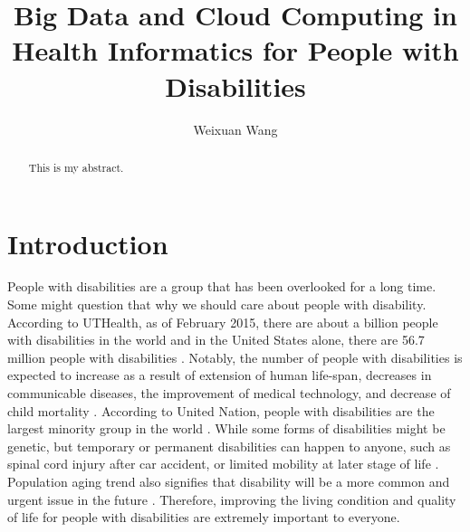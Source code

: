 \documentclass[sigconf]{acmart}
\begin{document}
\title{Big Data and Cloud Computing in Health Informatics for People with Disabilities}


\author{Weixuan Wang}


\renewcommand{\shortauthors}{W. Wang}


\begin{abstract}
This is my abstract.
\end{abstract}



\maketitle



\section{Introduction}
People with disabilities are a group that has been overlooked for a long time. Some might question that why
we should care about people with disability. According to UTHealth, as of February 2015, there are about a 
billion people with disabilities in the world and in the United States alone, there are 56.7 million people
with disabilities \cite{Lex}. Notably, the number of people with disabilities is expected to increase as a 
result of extension of human life-span, decreases in communicable diseases, the improvement of medical
technology, and decrease of child mortality \cite{SMITH1987376}. According to United Nation, people with 
disabilities are the largest minority group in the world \cite{Appleyard2005,DARCY2010816,Lex}. While some 
forms of disabilities might be genetic, but temporary or permanent disabilities can happen to anyone, such 
as spinal cord injury after car accident, or limited mobility at later stage of life \cite{Lex}. Population
aging trend also signifies that disability will be a more common and urgent issue in the future \cite{Grue}. 
Therefore, improving the living condition and quality of life for people with disabilities are extremely important to everyone.
\end{document}
